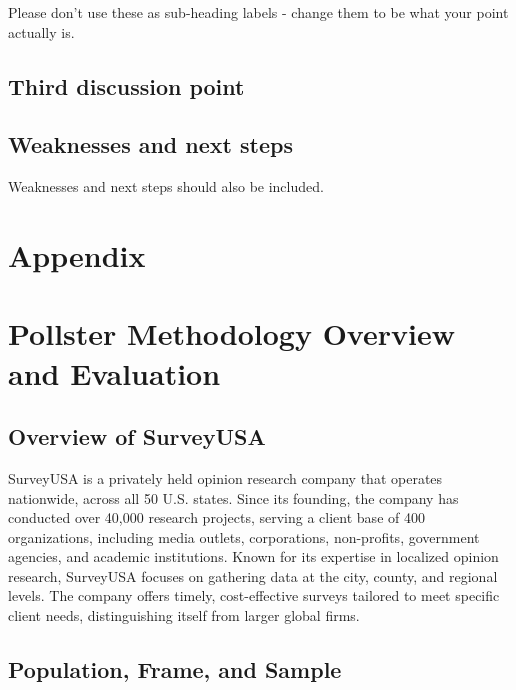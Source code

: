 \documentclass[
  letterpaper,
  DIV=11,
  numbers=noendperiod]{scrartcl}
\begin{document}
Please don't use these as sub-heading labels - change them to be what
your point actually is.

\subsection{Third discussion point}\label{third-discussion-point}

\subsection{Weaknesses and next steps}\label{weaknesses-and-next-steps}

Weaknesses and next steps should also be included.

\newpage

\appendix

\section*{Appendix}\label{appendix}

\section{Pollster Methodology Overview and
Evaluation}\label{pollster-methodology-overview-and-evaluation}

\subsection{\texorpdfstring{Overview of SurveyUSA\\
}{Overview of SurveyUSA }}\label{overview-of-surveyusa}

SurveyUSA is a privately held opinion research company that operates
nationwide, across all 50 U.S. states. Since its founding, the company
has conducted over 40,000 research projects, serving a client base of
400 organizations, including media outlets, corporations, non-profits,
government agencies, and academic institutions. Known for its expertise
in localized opinion research, SurveyUSA focuses on gathering data at
the city, county, and regional levels. The company offers timely,
cost-effective surveys tailored to meet specific client needs,
distinguishing itself from larger global firms.

\subsection{\texorpdfstring{Population, Frame, and Sample\\
}{Population, Frame, and Sample }}\label{population-frame-and-sample}
\end{document}
